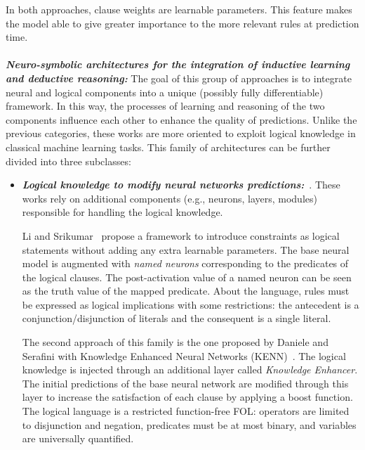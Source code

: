 In both approaches, clause weights are learnable parameters. This feature makes the model able to give greater importance to the more relevant rules at prediction time.
\\\\
\textit{\textbf{Neuro-symbolic architectures for the integration of inductive learning and deductive reasoning:}} The goal of this group of approaches is to integrate neural and logical components into a unique (possibly fully differentiable) framework. In this way, the processes of learning and reasoning of the two components influence each other to enhance the quality of predictions. Unlike the previous categories, these works are more oriented to exploit logical knowledge in classical machine learning tasks. This family of architectures can be further divided into three subclasses:
\begin{itemize}
    \item \textbf{\textit{Logical knowledge to modify neural networks predictions:}}~\cite{liSrikumar,rnm,dlm,kenn}. These works rely on additional components (e.g., neurons, layers, modules) responsible for handling the logical knowledge.
    
    Li and Srikumar~\cite{liSrikumar} propose a framework to introduce constraints as logical statements without adding any extra learnable parameters. The base neural model is augmented with \textit{named neurons} corresponding to the predicates of the logical clauses. The post-activation value of a named neuron can be seen as the truth value of the mapped predicate. About the language, rules must be expressed as logical implications with some restrictions: the antecedent is a conjunction/disjunction of literals and the consequent is a single literal. 
    
    The second approach of this family is the one proposed by Daniele and Serafini with Knowledge Enhanced Neural Networks (KENN)~\cite{kenn}. The logical knowledge is injected through an additional layer called \textit{Knowledge Enhancer}. The initial predictions of the base neural network are modified through this layer to increase the satisfaction of each clause by applying a boost function. The logical language is a restricted function-free FOL: operators are limited to disjunction and negation, predicates must be at most binary, and variables are universally quantified.
    

\end{itemize}
